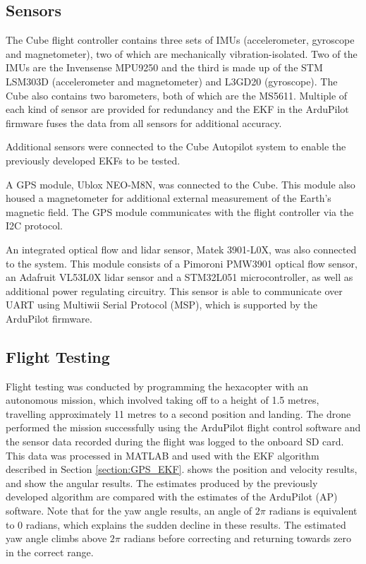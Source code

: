 \subsection{Sensors}
The Cube flight controller contains three sets of IMUs (accelerometer, gyroscope and magnetometer), two of which are mechanically vibration-isolated. Two of the IMUs are the Invensense MPU9250 and the third is made up of the STM LSM303D (accelerometer and magnetometer) and L3GD20 (gyroscope). The Cube also contains two barometers, both of which are the MS5611. Multiple of each kind of sensor are provided for redundancy and the EKF in the ArduPilot firmware fuses the data from all sensors for additional accuracy.

Additional sensors were connected to the Cube Autopilot system to enable the previously developed EKFs to be tested.  

A GPS module, Ublox NEO-M8N, was connected to the Cube. This module also housed a magnetometer for additional external measurement of the Earth's magnetic field. The GPS module communicates with the flight controller via the I2C protocol.


An integrated optical flow and lidar sensor, Matek 3901-L0X, was also connected to the system. This module consists of a Pimoroni PMW3901 optical flow sensor, an Adafruit VL53L0X lidar sensor and a STM32L051 microcontroller, as well as additional power regulating circuitry. This sensor is able to communicate over UART using Multiwii Serial Protocol (MSP), which is supported by the ArduPilot firmware.

\subsection{Flight Testing}
Flight testing was conducted by programming the hexacopter with an autonomous mission, which involved taking off to a height of 1.5 metres, travelling approximately 11 metres to a second position and landing. The drone performed the mission successfully using the ArduPilot flight control software and the sensor data recorded during the flight was logged to the onboard SD card. This data was processed in MATLAB and used with the EKF algorithm described in Section \ref{section:GPS_EKF}.  shows the position and velocity results, and  show the angular results. The estimates produced by the previously developed algorithm are compared with the estimates of the ArduPilot (AP) software. Note that for the yaw angle results, an angle of $2\pi$ radians is equivalent to 0 radians, which explains the sudden decline in these results. The estimated yaw angle climbs above $2\pi$ radians before correcting and returning towards zero in the correct range. 

